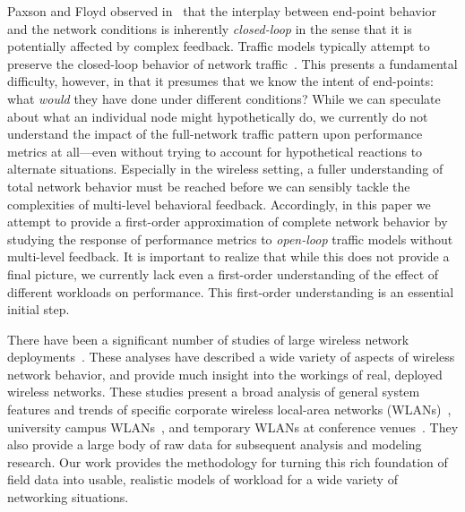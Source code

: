\documentclass[conference]{IEEEtran}
\newcommand{\caps}[1]{{\small{#1}}}
\begin{document}
Paxson and Floyd observed in~\cite{Paxson95} that the interplay between end-point behavior and the network conditions is inherently \textit{closed-loop} in the sense that it is potentially affected by complex feedback. Traffic models typically attempt to preserve the closed-loop behavior of network traffic~\cite{Avallone04,Hernandez06:dissertation}. This presents a fundamental difficulty, however, in that it presumes that we know the intent of end-points: what \textit{would} they have done under different conditions? While we can speculate about what an individual node might hypothetically do, we currently do not understand the impact of the full-network traffic pattern upon performance metrics at all---even without trying to account for hypothetical reactions to alternate situations. Especially in the wireless setting, a fuller understanding of total network behavior must be reached before we can sensibly tackle the complexities of multi-level behavioral feedback. Accordingly, in this paper we attempt to provide a first-order approximation of complete network behavior by studying the response of performance metrics to \textit{open-loop} traffic models without multi-level feedback. It is important to realize that while this does not provide a final picture, we currently lack even a first-order understanding of the effect of different workloads on performance. This first-order understanding is an essential initial step.

There have been a significant number of studies of large wireless network deployments~\cite{Tang99,Balachandran02,Balazinska03,Kotz02,Henderson04,Schwab04,Chinchilla04,Jardosh05:ewind}. These analyses have described a wide variety of aspects of wireless network behavior, and provide much insight into the workings of real, deployed wireless networks. These studies present a broad analysis of general system features and trends of specific corporate wireless local-area networks (\caps{WLAN}s)~\cite{Tang99,Balazinska03}, university campus \caps{WLAN}s~\cite{Tang00,Kotz02,Chinchilla04,Schwab04,Henderson04,Tuduce05}, and temporary \caps{WLAN}s at conference venues~\cite{Balachandran02,Jardosh05:ewind}. They also provide a large body of raw data for subsequent analysis and modeling research. Our work provides the methodology for turning this rich foundation of field data into usable, realistic models of workload for a wide variety of networking situations.
\end{document}
